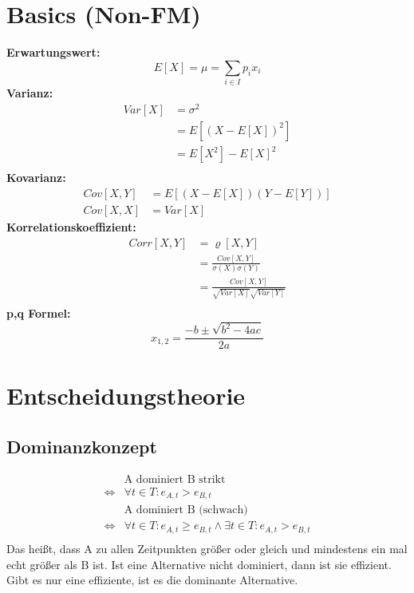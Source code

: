 \documentclass[leqno]{scrartcl}
\begin{document}
\begin{multicols}{4}

\section{Basics (Non-FM)}

\textbf{Erwartungswert:}
  \begin{equation*}
    E[X]=\mu=\sum_{i \in I} p_i x_i
  \end{equation*}
\textbf{Varianz:}
  \begin{equation*}
    \begin{split}
      Var[X]&=\sigma^2\\
          &=E[(X-E[X])^2]\\
          &=E[X^2]-E[X]^2\\
    \end{split}
  \end{equation*}
\textbf{Kovarianz:}
  \begin{equation*}
    \begin{split}
    Cov[X,Y]&=E[(X-E[X])(Y-E[Y])]\\
    Cov[X,X]&=Var[X]
    \end{split}
  \end{equation*}
\textbf{Korrelationskoeffizient:}
  \begin{equation*}
    \begin{split}
      Corr[X,Y] &= \varrho [X,Y]\\
                &= \frac{Cov[X,Y]}{\sigma (X) \sigma (Y)}\\
                &= \frac{Cov[X,Y]}{\sqrt{Var[X]}\sqrt{Var[Y]}}\\
    \end{split}
  \end{equation*}
\textbf{p,q Formel:}
  \begin{equation*}
    x_{1,2}=\frac{-b \pm \sqrt{b^2 - 4ac}}{2a}
  \end{equation*}

\section{Entscheidungstheorie}

\subsection{Dominanzkonzept}
\begin{align*}
&\text{A dominiert B strikt}\\
\Leftrightarrow  &\forall t \in T : e_{A,t} > e_{B,t}\\
&\text{A dominiert B (schwach)}\\
\Leftrightarrow  &\forall t \in T : e_{A,t} \geq e_{B,t} \wedge \exists t \in T : e_{A,t} > e_{B,t}\\
\end{align*}
Das heißt, dass A zu allen Zeitpunkten größer oder gleich und mindestens ein mal 
echt größer als B ist. Ist eine Alternative nicht dominiert, dann ist sie 
effizient. Gibt es nur eine effiziente, ist es die dominante Alternative.


\end{multicols}
\end{document}
